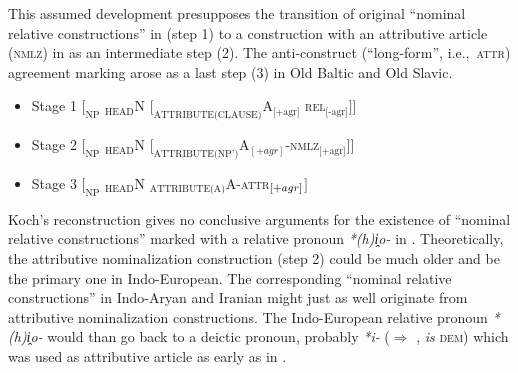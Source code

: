 This assumed development presupposes the transition of original “nominal relative constructions” in  (step 1) to a construction with an attributive article (\textsc{nmlz}) in  as an intermediate step (2). The anti\hyp{}construct (“long-form”, i.e.,~\textsc{attr}) agreement marking arose as a last step (3) in Old Baltic and Old Slavic.
\begin{itemize}
\item Stage 1 $[_{\text{NP}}$ $_{\text{HEAD}}$N $[_{\text{ATTRIBUTE(CLAUSE)}}$A$_{\text{[+{agr}]}}$ \textsc{rel}$_{\text{[-{agr}]}}$$] ]$
\item Stage 2 $[_{\text{NP}}$ $_{\text{HEAD}}$N $[_{\text{ATTRIBUTE(NP')}}$A$_{[+{agr}]}$-\textsc{nmlz}$_{\text{[+{agr}]}}$$] ]$ \label{koch constit nomzr}
\item Stage 3 $[_{\text{NP}}$ $_{\text{HEAD}}$N $_{\text{ATTRIBUTE(A)}}$A-\textsc{attr}$_{\text[+{agr}]}$$]$
\end{itemize}
Koch's reconstruction gives no conclusive arguments for the existence of “nominal relative constructions” marked with a relative pronoun \textit{*(h)i̭o-} in . Theoretically, the attributive nominalization construction (step 2) could be much older and be the primary one in Indo-European. The corresponding “nominal relative constructions” in Indo-Aryan and Iranian might just as well originate from attributive nominalization constructions. The Indo-European relative pronoun \textit{*(h)i̭o-} would than go back to a deictic pronoun, probably \textit{*i-} ($\Rightarrow$ ,  \textit{is} \textsc{dem}) which was used as attributive article as early as in .


